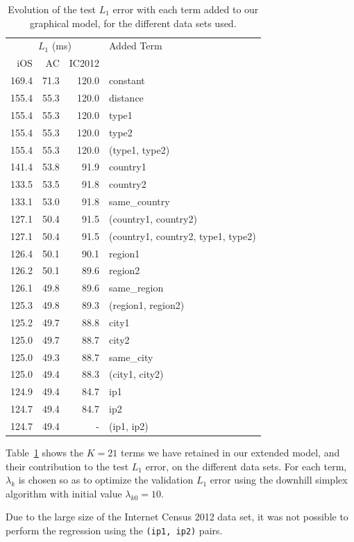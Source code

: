 \documentclass[10pt,a4paper,notitlepage,twocolumn]{article}
\begin{document}
\begin{table}[htp]
\centering
\begin{tabular}{|rrrl|}
\hline \multicolumn{3}{|c}{$L_1$ (ms)} & Added Term \\
iOS & AC & IC2012 &  \\ \hline\hline
169.4 & 71.3 & 120.0 & constant \\
155.4 & 55.3 & 120.0 & distance \\
155.4 & 55.3 & 120.0 & type1 \\
155.4 & 55.3 & 120.0 & type2 \\
155.4 & 55.3 & 120.0 & (type1, type2) \\
141.4 & 53.8 & 91.9 & country1 \\
133.5 & 53.5 & 91.8 & country2 \\
133.1 & 53.0 & 91.8 & same\_country \\
127.1 & 50.4 & 91.5 & (country1, country2) \\
127.1 & 50.4 & 91.5 & (country1, country2, type1, type2) \\
126.4 & 50.1 & 90.1 & region1 \\
126.2 & 50.1 & 89.6 & region2 \\
126.1 & 49.8 & 89.6 & same\_region \\
125.3 & 49.8 & 89.3 & (region1, region2) \\
125.2 & 49.7 & 88.8 & city1 \\
125.0 & 49.7 & 88.7 & city2 \\
125.0 & 49.3 & 88.7 & same\_city \\
125.0 & 49.4 & 88.3 & (city1, city2) \\
124.9 & 49.4 & 84.7 & ip1 \\
124.7 & 49.4 & 84.7 & ip2 \\
124.7 & 49.4 & - & (ip1, ip2) \\
\hline
\end{tabular}
\caption{Evolution of the test $L_1$ error with each term added to our
graphical model, for the different data sets used.}
\label{tab:terms}
\end{table}

Table~\ref{tab:terms} shows the $K=21$ terms we have retained in our
extended model, and their contribution to the test $L_1$ error,
on the different data sets.  For each term, $\lambda_k$
is chosen so as to optimize the validation $L_1$ error using the
downhill simplex algorithm with initial value $\lambda_{k0}=10$.

Due to the large size of the Internet Census 2012 data set, it was not
possible to perform the regression using the \texttt{(ip1, ip2)} pairs.
\end{document}
